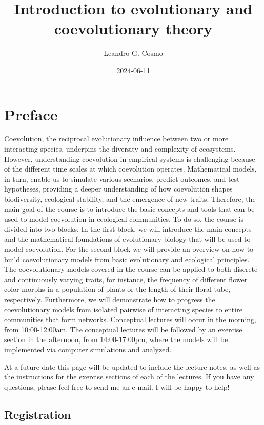 \documentclass[
]{book}
\title{Introduction to evolutionary and coevolutionary theory}
\author{Leandro G. Cosmo}
\date{2024-06-11}
\begin{document}
\maketitle

{
\setcounter{tocdepth}{1}
\tableofcontents
}
\hypertarget{preface}{%
\chapter{Preface}\label{preface}}

Coevolution, the reciprocal evolutionary influence between two or more interacting species, underpins the diversity and complexity of ecosystems. However, understanding coevolution in empirical systems is challenging because of the different time scales at which coevolution operates. Mathematical models, in turn, enable us to simulate various scenarios, predict outcomes, and test hypotheses, providing a deeper understanding of how coevolution shapes biodiversity, ecological stability, and the emergence of new traits. Therefore, the main goal of the course is to introduce the basic concepts and tools that can be used to model coevolution in ecological communities. To do so, the course is divided into two blocks. In the first block, we will introduce the main concepts and the mathematical foundations of evolutionary biology that will be used to model coevolution. For the second block we will provide an overview on how to build coevolutionary models from basic evolutionary and ecological principles. The coevolutionary models covered in the course can be applied to both discrete and continuously varying traits, for instance, the frequency of different flower color morphs in a population of plants or the length of their floral tube, respectively. Furthermore, we will demonstrate how to progress the coevolutionary models from isolated pairwise of interacting species to entire communities that form networks. Conceptual lectures will occur in the morning, from 10:00-12:00am. The conceptual lectures will be followed by an exercise section in the afternoon, from 14:00-17:00pm, where the models will be implemented via computer simulations and analyzed.

At a future date this page will be updated to include the lecture notes, as well as the instructions for the exercise sections of each of the lectures. If you have any questions, please feel free to send me an e-mail. I will be happy to help!

\hypertarget{registration}{%
\section{Registration}\label{registration}}
\end{document}

